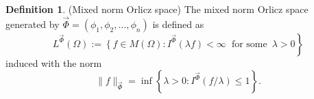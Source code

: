 \documentclass[11pt, a4paper]{article}
\theoremstyle{definition}
\newtheorem{defin}[thm]{Definition}
\numberwithin{equation}{section}
\def\RR{\mathbb R}
\newcommand{\vc}[1]{\overrightarrow{#1}}
\begin{document}

\begin{defin}(Mixed norm Orlicz space)
    The mixed norm Orlicz space generated by $ \overrightarrow{\Phi}=(\phi_1,\phi_2,\dots,\phi_n)$ is defined as
    $$L^{\overrightarrow{\Phi}}(\Omega) :=\left\lbrace f \right. \in M(\Omega) : I^{\overrightarrow{\Phi}}(\lambda f) < \infty \hspace{3pt} \text{ for some }\hspace{2pt} \lambda >0 \left.\right\rbrace $$
    induced with the norm
    $$\|f\|_{\overrightarrow{\Phi}}= \inf \left\lbrace \lambda >0 : I^{\vc{\Phi}}(f/\lambda) \leq 1 \right\rbrace. $$	
\end{defin}
 
 
\end{document}
